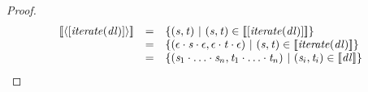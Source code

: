 \documentclass[numbers,10pt,preprint\ifanon ,nocopyrightspace\fi]{sigplanconf}
\begin{document}
\begin{proof}
  \[
    \begin{array}{rcl}
      \SemanticsOf{\DNFLensOf{\SequenceLensOf{\IterateLensOf{\DNFLens}}}}
      & = &
            \SetOf{
            (\String,\StringAlt)
            \SuchThat
            (\String,\StringAlt)\in\SemanticsOf{\SequenceLensOf{\IterateLensOf{\DNFLens}}}}\\
      & = &
            \SetOf{
            (\EmptyString\Concat\String\Concat\EmptyString,\EmptyString\Concat\StringAlt\Concat\EmptyString)
            \SuchThat
            (\String,\StringAlt)\in\SemanticsOf{\IterateLensOf{\DNFLens}}}\\
      & = &
            \SetOf{
            (\String_1\Concat\ldots\Concat\String_n,\StringAlt_1\Concat\ldots\Concat\StringAlt_n)
            \SuchThat
            (\String_i,\StringAlt_i)\in\SemanticsOf{\DNFLens}}
    \end{array}
  \]
\end{proof}
\end{document}
